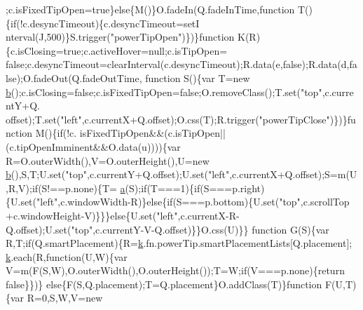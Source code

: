 \begin{DoxyCode}
      ;c.isFixedTipOpen=\textcolor{keyword}{true}\}\textcolor{keywordflow}{else}\{M()\}O.fadeIn(Q.fadeInTime,\textcolor{keyword}{function} T()\{\textcolor{keywordflow}{if}(!c.desyncTimeout)\{c.desyncTimeout=setI
      nterval(J,500)\}S.trigger(\textcolor{stringliteral}{"powerTipOpen"})\})\}\textcolor{keyword}{function} K(R)\{c.isClosing=\textcolor{keyword}{true};c.activeHover=null;c.isTipOpen=\textcolor{keyword}{
      false};c.desyncTimeout=clearInterval(c.desyncTimeout);R.data(e,\textcolor{keyword}{false});R.data(d,\textcolor{keyword}{false});O.fadeOut(Q.fadeOutTime,\textcolor{keyword}{
      function} S()\{var T=\textcolor{keyword}{new} \hyperlink{jquery_8js_aa4026ad5544b958e54ce5e106fa1c805}{b}();c.isClosing=\textcolor{keyword}{false};c.isFixedTipOpen=\textcolor{keyword}{false};O.removeClass();T.set(\textcolor{stringliteral}{"top"},c.currentY+Q.
      offset);T.set(\textcolor{stringliteral}{"left"},c.currentX+Q.offset);O.css(T);R.trigger(\textcolor{stringliteral}{"powerTipClose"})\})\}\textcolor{keyword}{function} M()\{\textcolor{keywordflow}{if}(!c.
      isFixedTipOpen&&(c.isTipOpen||(c.tipOpenImminent&&O.data(u))))\{var R=O.outerWidth(),V=O.outerHeight(),U=\textcolor{keyword}{new} 
      \hyperlink{jquery_8js_aa4026ad5544b958e54ce5e106fa1c805}{b}(),S,T;U.set(\textcolor{stringliteral}{"top"},c.currentY+Q.offset);U.set(\textcolor{stringliteral}{"left"},c.currentX+Q.offset);S=m(U,R,V);\textcolor{keywordflow}{if}(S!==p.none)\{T=
      \hyperlink{jquery_8js_aa4d4888597588a84fd5b1184d00c91f3}{a}(S);\textcolor{keywordflow}{if}(T===1)\{\textcolor{keywordflow}{if}(S===p.right)\{U.set(\textcolor{stringliteral}{"left"},c.windowWidth-R)\}\textcolor{keywordflow}{else}\{\textcolor{keywordflow}{if}(S===p.bottom)\{U.set(\textcolor{stringliteral}{"top"},c.scrollTop
      +c.windowHeight-V)\}\}\}\textcolor{keywordflow}{else}\{U.set(\textcolor{stringliteral}{"left"},c.currentX-R-Q.offset);U.set(\textcolor{stringliteral}{"top"},c.currentY-V-Q.offset)\}\}O.css(U)\}\}\textcolor{keyword}{
      function} G(S)\{var R,T;\textcolor{keywordflow}{if}(Q.smartPlacement)\{R=\hyperlink{jquery_8js_ab26645c014aa005ecedef329ecf58c99}{k}.fn.powerTip.smartPlacementLists[Q.placement];
      \hyperlink{jquery_8js_ab26645c014aa005ecedef329ecf58c99}{k}.each(R,\textcolor{keyword}{function}(U,W)\{var V=m(F(S,W),O.outerWidth(),O.outerHeight());T=W;\textcolor{keywordflow}{if}(V===p.none)\{\textcolor{keywordflow}{return} \textcolor{keyword}{false}\}\})\}\textcolor{keywordflow}{
      else}\{F(S,Q.placement);T=Q.placement\}O.addClass(T)\}\textcolor{keyword}{function} F(U,T)\{var R=0,S,W,V=\textcolor{keyword}{new} 

\end{DoxyCode}
